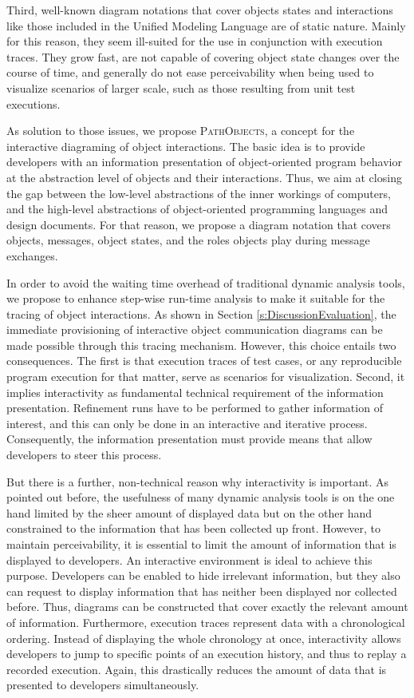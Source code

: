 Third, well-known diagram notations that cover objects states and interactions like those included in the Unified Modeling Language are of static nature.
Mainly for this reason, they seem ill-suited for the use in conjunction with execution traces.
They grow fast, are not capable of covering object state changes over the course of time, and generally do not ease perceivability when being used to visualize scenarios of larger scale, such as those resulting from unit test executions.

As solution to those issues, we propose \textsc{PathObjects}, a concept for the interactive diagraming of object interactions.
The basic idea is to provide developers with an information presentation of object-oriented program behavior at the abstraction level of objects and their interactions.
Thus, we aim at closing the gap between the low-level abstractions of the inner workings of computers, and the high-level abstractions of object-oriented programming languages and design documents.
For that reason, we propose a diagram notation that covers objects, messages, object states, and the roles objects play during message exchanges.

In order to avoid the waiting time overhead of traditional dynamic analysis tools, we propose to enhance step-wise run-time analysis to make it suitable for the tracing of object interactions.
As shown in Section \ref{s:DiscussionEvaluation}, the immediate provisioning of interactive object communication diagrams can be made possible through this tracing mechanism.
However, this choice entails two consequences.
The first is that execution traces of test cases, or any reproducible program execution for that matter, serve as scenarios for visualization.
Second, it implies interactivity as fundamental technical requirement of the information presentation.
Refinement runs have to be performed to gather information of interest, and this can only be done in an interactive and iterative process.
Consequently, the information presentation must provide means that allow developers to steer this process.

But there is a further, non-technical reason why interactivity is important.
As pointed out before, the usefulness of many dynamic analysis tools is on the one hand limited by the sheer amount of displayed data  but on the other hand constrained to the information that has been collected up front.
However, to maintain perceivability, it is essential to limit the amount of information that is displayed to developers.
An interactive environment is ideal to achieve this purpose.
Developers can be enabled to hide irrelevant information, but they also can request to display information that has neither been displayed nor collected before.
Thus, diagrams can be constructed that cover exactly the relevant amount of information.
Furthermore, execution traces represent data with a chronological ordering.
Instead of displaying the whole chronology at once, interactivity allows developers to jump to specific points of an execution history, and thus to replay a recorded execution.
Again, this drastically reduces the amount of data that is presented to developers simultaneously.

